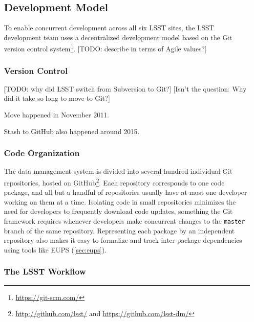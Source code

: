 \subsection{Development Model}\label{sec:development}

To enable concurrent development across all six LSST sites, the LSST development team uses a decentralized development model based on the Git version control system\footnote{\url{https://git-scm.com/}}.
[TODO: describe in terms of Agile values?]

\subsubsection{Version Control}\label{sec:git}\label{sec:subversion}

[TODO: why did LSST switch from Subversion to Git?] [Isn't the question: Why did it take so long to move to Git?]

Move happened in November 2011.

Stash to GitHub also happened around 2015.

\subsubsection{Code Organization}\label{sec:git_repositories}

The data management system is divided into several hundred individual Git repositories, hosted on GitHub\footnote{\url{http://github.com/lsst/} and \url{https://github.com/lsst-dm/}}.
Each repository corresponds to one code package, and all but a handful of repositories usually have at most one developer working on them at a time.
Isolating code in small repositories minimizes the need for developers to frequently download code updates, something the Git framework requires whenever developers make concurrent changes to the \texttt{master} branch of the same repository.
Representing each package by an independent repository also makes it easy to formalize and track inter-package dependencies using tools like EUPS (\autoref{sec:eups}).

\subsubsection{The LSST Workflow}\label{sec:dev_workflow}

